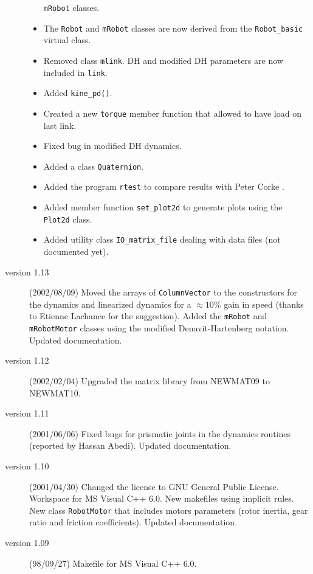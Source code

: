 \documentclass[dvips,11pt,fleqn]{report}
\begin{document}
\begin{description}
\begin{itemize}
    \texttt{mRobot} classes. 
  \item The \texttt{Robot} and \texttt{mRobot} classes are now derived
    from the \texttt{Robot\_basic} virtual class.
  \item Removed class \texttt{mlink}. DH and modified DH parameters
    are now included in \texttt{link}.
  \item Added \texttt{kine\_pd()}.
  \item Created a new \texttt{torque} member function that allowed to
    have load on last link.
  \item Fixed bug in modified DH dynamics.
  \item Added a class \texttt{Quaternion}.
  \item Added the program \texttt{rtest} to compare results with Peter
    Corke .
  \item Added member function \texttt{set\_plot2d} to generate plots
    using the \texttt{Plot2d} class.
  \item Added utility class \texttt{IO\_matrix\_file} dealing with
    data files (not documented yet).
  \end{itemize}

\item[version 1.13] (2002/08/09) Moved the arrays of
  \texttt{ColumnVector} to the constructors for the dynamics and
  linearized dynamics for a $\approx 10 \%$ gain in speed (thanks to
  Etienne Lachance for the suggestion). Added the \texttt{mRobot} and
  \texttt{mRobotMotor} classes using the modified Denavit-Hartenberg
  notation. Updated documentation.

\item[version 1.12] (2002/02/04) Upgraded the matrix library from
  \textsf{NEWMAT09} to \textsf{NEWMAT10}.

\item[version 1.11] (2001/06/06) Fixed bugs for prismatic joints in
  the dynamics routines (reported by Hassan Abedi).  Updated
  documentation.
  
\item[version 1.10] (2001/04/30) Changed the license to GNU General
  Public License. Workspace for MS \textsf{Visual C++} 6.0. New makefiles using
  implicit rules. New class \texttt{RobotMotor} that includes motors
  parameters (rotor inertia, gear ratio and friction coefficients).
  Updated documentation.

\item[version 1.09] (98/09/27) Makefile for \textsf{MS Visual C++} 6.0.  


\end{description}
\end{document}
